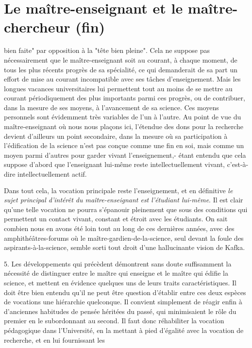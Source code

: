 \documentclass[11pt,a4paper]{article}
\begin{document}
\section{Le maître-enseignant et le maître-chercheur (fin)}


bien faite" par opposition à la "tête bien pleine". Cela ne suppose pas nécessairement que le maître-enseignant soit au courant, à chaque moment, de tous les plus récents progrès de sa spécialité, ce qui demanderait de sa part un effort de mise au courant incompatible avec ses tâches d'enseignement. Mais les longues vacances universitaires lui permettent tout au moins de se mettre au courant périodiquement des plus importants parmi ces progrès, ou de contribuer, dans la mesure de ses moyens, à l'avancement de sa science. Ces moyens personnels sont évidemment très variables de l'un à l'autre. Au point de vue du maître-enseignant où nous nous plaçons ici, l'étendue des dons pour la recherche devient d'ailleurs un point secondaire, dans la mesure où sa participation à l'édification de la science n'est pas conçue comme une fin en soi, mais comme un moyen parmi d'autres pour garder vivant l'enseignement,- étant entendu que cela suppose d'abord que l'enseignant lui-même reste intellectuellement vivant, c'est-à-dire intellectuellement actif.

Dans tout cela, la vocation principale reste l'enseignement, et en définitive \emph{le sujet principal d'intérêt du maître-enseignant est l'étudiant lui-même}. Il est clair qu'une telle vocation ne pourra s'épanouir pleinement que sous des conditions qui permettent un contact vivant, constant et étroit avec les étudiants. On sait combien nous en avons été loin tout au long de ces dernières années, avec des amphithéâtres-forums où le maître-gardien-de-la-science, seul devant la foule des aspirants-à-la-science, semble sorti tout droit d'une hallucinante vision de Kafka.

5. Les développements qui précèdent démontrent sans doute suffisamment la nécessité de distinguer entre le maître qui enseigne et le maître qui édifie la science, et mettent en évidence quelques uns de leurs traits caractéristiques. Il doit être bien entendu qu'il ne peut être question d'établir entre ces deux espèces de vocations une hiérarchie quelconque. Il convient simplement de réagir enfin à d'anciennes habitudes de pensée héritées du passé, qui minimisaient le rôle du premier en le subordonnant au second. Il faut donc réhabiliter la vocation pédagogique dans l'Université, en la mettant à pied d'égalité avec la vocation de recherche, et en lui fournissant les
\end{document}
